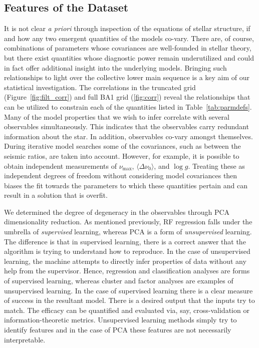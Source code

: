 \subsection{Features of the Dataset}
It is not clear \emph{a priori} through inspection of the equations of stellar structure, if and how any two emergent quantities of the models co-vary. 
There are, of course, combinations of parameters whose covariances are well-founded in stellar theory, but there exist quantities whose diagnostic power remain underutilized and could in fact offer additional insight into the underlying models.
Bringing such relationships to light over the collective lower main sequence is a key aim of our statistical investigation. 
The correlations in the truncated grid (Figure~\ref{fig:filt_corr}) and full BA1 grid (\ref{fig:corr}) reveal the relationships that can be utilized to constrain each of the quantities listed in Table~\ref{tab:parmdefs}.
Many of the model properties that we wish to infer correlate with several observables simultaneously.  This indicates that the observables carry redundant information about the star. 
In addition, observables co-vary amongst themselves. During  iterative model searches some of the covariances, such as between the seismic ratios, are taken into account.  However, for example, it is possible to obtain independent measurements of $\nu_{\max}$, ${\langle\Delta\nu_0\rangle}$, and ${\log{} g}$. Treating these as independent degrees of freedom without considering model covariances then biases the fit towards the parameters to which these quantities pertain and can result in a solution that is overfit. 

We determined the degree of degeneracy in the observables through PCA dimensionality reduction. 
As mentioned previously, RF regression falls under the umbrella of \emph{supervised} learning, whereas PCA is a form of \emph{unsupervised} learning. 
The difference is that in supervised learning, there is a correct answer that the algorithm is trying to understand how to reproduce.
In the case of unsupervised learning, the machine attempts to directly infer properties of data without any help from the supervisor. Hence, regression and classification analyses are forms of supervised learning, whereas cluster and factor analyses are examples of unsupervised learning.
In the case of supervised learning there is a clear measure of success in the resultant model. 
There is a desired output that the inputs try to match. 
The efficacy can be quantified and evaluated via, say, cross-validation or information-theoretic metrics. 
Unsupervised learning methods simply try to identify features and in the case of PCA these features are not necessarily interpretable. 

